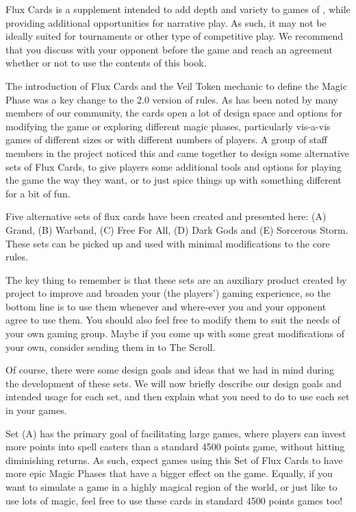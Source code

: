 
\label{introduction}%

Flux Cards is a supplement intended to add depth and variety to games of \nameofthegame{}, while providing additional opportunities for narrative play. As such, it may not be ideally suited for tournaments or other type of competitive play. We recommend that you discuss with your opponent before the game and reach an agreement whether or not to use the contents of this book.


The introduction of Flux Cards and the Veil Token mechanic to define the Magic Phase was a key change to the 2.0 version of \nameofthegame{} rules. As has been noted by many members of our community, the cards open a lot of design space and options for modifying the game or exploring different magic phases, particularly vis-a-vis games of different sizes or with different numbers of players. A group of staff members in the project noticed this and came together to design some alternative sets of Flux Cards, to give players some additional tools and options for playing the game the way they want, or to just spice things up with something different for a bit of fun.

Five alternative sets of flux cards have been created and presented here: (A) Grand, (B) Warband, (C) Free For All, (D) Dark Gods and (E) Sorcerous Storm. These sets can be picked up and used with minimal modifications to the core rules.


The key thing to remember is that these sets are an auxiliary product created by \theninthage{} project to improve and broaden your (the players') gaming experience, so the bottom line is to use them whenever and where-ever you and your opponent agree to use them. You should also feel free to modify them to suit the needs of your own gaming group. Maybe if you come up with some great modifications of your own, consider sending them in to The  Scroll.

Of course, there were some design goals and ideas that we had in mind during the development of these sets. We will now briefly describe our design goals and intended usage for each set, and then explain what you need to do to use each set in your games.


Set (A) has the primary goal of facilitating large games, where players can invest more points into spell casters than a standard 4500 points game, without hitting diminishing returns. As such, expect games using this Set of Flux Cards to have more epic Magic Phases that have a bigger effect on the game. Equally, if you want to simulate a game in a highly magical region of the world, or just like to use lots of magic, feel free to use these cards in standard 4500 points games too!


